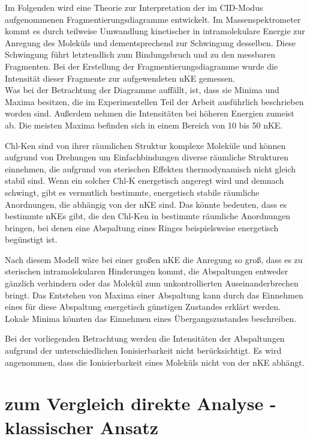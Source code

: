 Im Folgenden wird eine Theorie zur Interpretation der im CID-Modus aufgenommenen Fragmentierungsdiagramme entwickelt. Im Massenspektrometer kommt es durch teilweise Umwandlung kinetischer in intramolekulare Energie zur Anregung des Moleküls und dementsprechend zur Schwingung desselben. Diese Schwingung führt letztendlich zum Bindungsbruch und zu den messbaren Fragmenten. Bei der Erstellung der Fragmentierungsdiagramme wurde die Intensität dieser Fragmente zur aufgewendeten \gls{nKE} gemessen. \\

Was bei der Betrachtung der Diagramme auffällt, ist, dass sie Minima und Maxima besitzen, die im Experimentellen Teil der Arbeit ausführlich beschrieben worden sind. Außerdem nehmen die Intensitäten bei höheren Energien zumeist ab. Die meisten Maxima befinden sich in einem Bereich von 10 bis 50 \gls{nKE}. 

\gls{Chl-K}en sind von ihrer räumlichen Struktur komplexe Moleküle und können aufgrund von Drehungen um Einfachbindungen diverse räumliche Strukturen einnehmen, die aufgrund von sterischen Effekten thermodynamisch nicht gleich stabil sind. Wenn ein solcher \gls{Chl-K} energetisch angeregt wird und demnach schwingt, gibt es vermutlich bestimmte, energetisch stabile räumliche Anordnungen, die abhängig von der \gls{nKE} sind. Das könnte bedeuten, dass es bestimmte \gls{nKE}s gibt, die den \gls{Chl-K}en in bestimmte räumliche Anordnungen bringen, bei denen eine Abspaltung eines Ringes beispielsweise energetisch begünstigt ist. 

Nach diesem Modell wäre bei einer großen \gls{nKE} die Anregung so groß, dass es zu sterischen intramolekularen Hinderungen kommt, die Abspaltungen entweder gänzlich verhindern oder das Molekül zum unkontrollierten Auseinanderbrechen bringt. Das Entstehen von Maxima einer Abspaltung kann durch das Einnehmen eines für diese Abspaltung energetisch günstigen Zustandes erklärt werden. Lokale Minima könnten das Einnehmen eines Übergangszustandes beschreiben.

Bei der vorliegenden Betrachtung werden die Intensitäten der Abspaltungen aufgrund der unterschiedlichen Ionisierbarkeit nicht berücksichtigt. Es wird angenommen, dass die Ionisierbarkeit eines Moleküls nicht von der \gls{nKE} abhängt.


\section{zum Vergleich direkte Analyse - klassischer Ansatz} \label{sec:VergleichDirektKlassisch}

